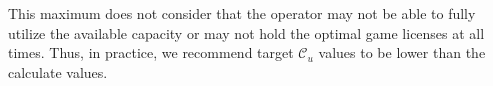 


This maximum does not consider that the operator may not be able to fully utilize the available capacity or may not hold the optimal game licenses at all times. Thus, in practice, we recommend target $\mathcal{C}_{u}$ values to be lower than the calculate values.




